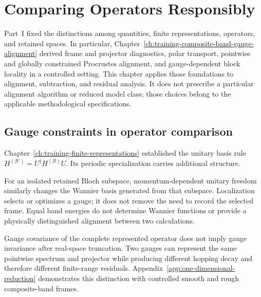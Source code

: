 \chapter{Comparing Operators Responsibly}

\label{ch:mathematical-foundations}


Part~I fixed the distinctions among quantities, finite representations,
operators, and retained spaces. In particular,
Chapter~\ref{ch:training-composite-band-gauge-alignment} derived frame and
projector diagnostics, polar transport, pointwise and globally constrained
Procrustes alignment, and gauge-dependent block locality in a controlled
setting. This chapter applies those foundations to alignment, subtraction, and
residual analysis. It does not prescribe a particular alignment algorithm or
reduced model class; those choices belong to the applicable methodological
specifications.

\section{Gauge constraints in operator comparison}

Chapter~\ref{ch:training-finite-representations} established the unitary basis
rule $H^{(\mathcal B')}=U^{\dagger}H^{(\mathcal B)}U$. Its periodic
specialization carries additional structure.

For an isolated retained Bloch subspace, momentum-dependent unitary freedom
similarly changes the Wannier basis generated from that subspace. Localization
selects or optimizes a gauge; it does not remove the need to record the selected
frame. Equal band energies do not determine Wannier functions or provide a
physically distinguished alignment between two calculations.

Gauge covariance of the complete represented operator does not imply gauge
invariance after real-space truncation. Two gauges can represent the same
pointwise spectrum and projector while producing different hopping decay and
therefore different finite-range residuals. Appendix~\ref{app:one-dimensional-reduction}
demonstrates this distinction with controlled smooth and rough composite-band
frames.


